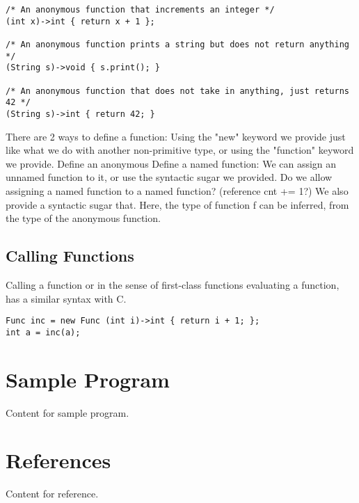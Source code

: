 \documentclass[11pt,A4]{article}
\begin{document}
\begin{lstlisting}
/* An anonymous function that increments an integer */
(int x)->int { return x + 1 }; 

/* An anonymous function prints a string but does not return anything */
(String s)->void { s.print(); }

/* An anonymous function that does not take in anything, just returns 42 */
(String s)->int { return 42; }
\end{lstlisting}

There are 2 ways to define a function: Using the "new" keyword we provide just like what we do with another non-primitive type, or using the "function" keyword we provide.
Define an anonymous
Define a named function: We can assign an unnamed function to it, or use the syntactic sugar we provided.
Do we allow assigning a named function to a named function? (reference cnt += 1?)
We also provide a syntactic sugar that. Here, the type of function f can be inferred, from the type of the anonymous function.

        
        
        \subsection{Calling Functions}
Calling a function or in the sense of first-class functions evaluating a function, has a similar syntax with C.
\begin{lstlisting}
Func inc = new Func (int i)->int { return i + 1; };
int a = inc(a);
\end{lstlisting}
        
        
        

    \newpage
    \section{Sample Program}
    Content for sample program.

    \newpage
    \section{References}
    Content for reference.
    
\end{document}
